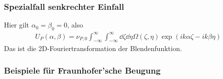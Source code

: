 
\subsubsection[Senkrechter Einfall]%
{Spezialfall senkrechter Einfall}
Hier gilt $\alpha_0=\beta_0=0$, also
\begin{gather*}
  U_P(\alpha,\beta) 
  = \nu_{P,0} \int_{-\infty}^{\infty}\int_{-\infty}^{\infty}
  \dd\zeta\dd\eta \Omega(\zeta,\eta)
  \exp\left( ik\alpha\zeta - ik\beta\eta \right)
\end{gather*}
Das ist die 2D-Fouriertransformation der Blendenfunktion.


\subsubsection{Beispiele für Fraunhofer'sche Beugung}
